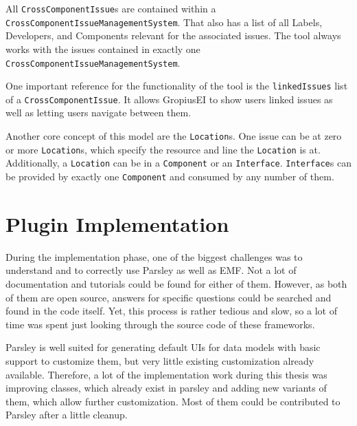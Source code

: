 All \lstinline|CrossComponentIssue|s are contained within a \lstinline|CrossComponentIssueManagementSystem|.
That also has a list of all Labels, Developers, and Components relevant for the associated issues.
The tool always works with the issues contained in exactly one \lstinline|CrossComponentIssueManagementSystem|.

One important reference for the functionality of the tool is the \lstinline|linkedIssues| list of a \lstinline|CrossComponentIssue|.
It allows \gls{GropiusEI} to show users linked issues as well as letting users navigate between them.

Another core concept of this model are the \lstinline|Location|s.
One issue can be at zero or more \lstinline|Location|s, which specify the resource and line the \lstinline|Location| is at.
Additionally, a \lstinline|Location| can be in a \lstinline|Component| or an \lstinline|Interface|.
\lstinline|Interface|s can be provided by exactly one \lstinline|Component| and consumed by any number of them.

\section{Plugin Implementation}
\label{sec:ch4:s4}
During the implementation phase, one of the biggest challenges was to understand and to correctly use \gls{Parsley} as well as \gls{EMF}.
Not a lot of documentation and tutorials could be found for either of them.
However, as both of them are open source, answers for specific questions could be searched and found in the code itself.
Yet, this process is rather tedious and slow, so a lot of time was spent just looking through the source code of these frameworks.

\Gls{Parsley} is well suited for generating default \glspl{UI} for data models with basic support to customize them, 
but very little existing customization already available.
Therefore, a lot of the implementation work during this thesis was improving classes, which already exist in parsley 
and adding new variants of them, which allow further customization.
Most of them could be contributed to \gls{Parsley} after a little cleanup.

